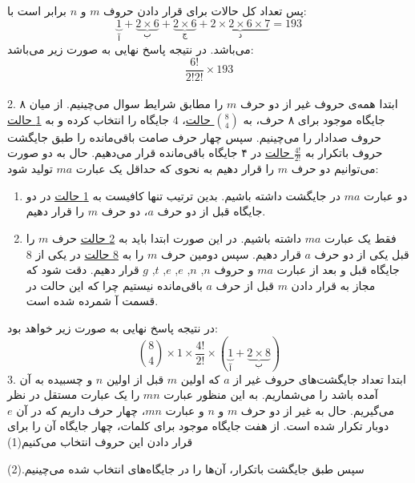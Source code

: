     \p
    پس تعداد کل حالات برای قرار دادن حروف 
    $m$ و $n$ 
     برابر است با:
    $$\underbrace{1}_{\text{آ}} + \underbrace{2\times 6}_{\text{ب}} + \underbrace{2\times 6}_{\text{ج}}+ \underbrace{2\times 2 \times 6 \times 7}_{\text{د}}‌=‌193$$
    می‌باشد.
    \p
    در نتیجه پاسخ نهایی به صورت زیر می‌باشد:
    $$\frac{6!}{2!2!} \times 193$$
    \\2.
    \p
    ابتدا همه‌ی حروف غیر از دو حرف $m$ را مطابق شرایط سوال می‌چینیم.
    از میان ۸ جایگاه موجود برای ۸ حرف، به 
    \underline{${8\choose 4}$ حالت}، 
    4
   جایگاه را انتخاب کرده و به
   \underline{1 حالت}
   حروف صدادار را می‌چینیم.
    سپس چهار حرف صامت باقی‌مانده
    را طبق جایگشت حروف باتکرار به
     \underline{$\frac{4!}{2!}$ حالت}
    در ۴ جایگاه باقی‌مانده قرار می‌دهیم.
    \p
    حال به دو صورت می‌توانیم دو حرف $m$ را قرار دهیم به نحوی که حداقل یک عبارت 
    $ma$ تولید شود:
    \begin{enumerate}
      \item 

      دو عبارت  $ma$  در جایگشت داشته باشیم.
       بدین ترتیب تنها کافیست به 
      \underline{1 حالت}
       در دو جایگاه قبل از دو حرف 
       $a$،  
       دو حرف 
       $m$ را قرار دهیم.

      \item
      فقط یک عبارت $ma$ داشته‌ باشیم. 
      در این صورت ابتدا باید به
      \underline{2 حالت}
      حرف 
      $m$ 
      را قبل یکی از دو حرف 
      $a$ 
      قرار دهیم. 
      سپس
       دومین حرف
      $m$
      را
      به
      \underline{8 حالت}
      در یکی از 8 جایگاه قبل و بعد از عبارت 
      $ma$
       و حروف 
       $n$, 
       $n$, 
       $e$, 
       $e$, 
       $t$, 
       $g$ 
       قرار دهیم.
       دقت شود که مجاز به قرار دادن 
      $m$
      قبل از حرف 
      $a$ 
      باقی‌مانده 
      نیستیم چرا که این حالت در قسمت آ شمرده شده است.
    \end{enumerate}
    \p
    در نتیجه پاسخ نهایی به صورت زیر خواهد بود:
    $${8\choose 4} \times 1 \times \frac{4!}{2!} \times (\underbrace{1}_{\text{آ}} + \underbrace{2 \times 8}_{\text{ب}})$$
    3.
    \p
    ابتدا تعداد جایگشت‌های  حروف غیر از $a$ که اولین $m$ قبل از اولین $n$ و چسبیده به آن آمده ‌باشد را می‌شماریم.
    به این منظور عبارت $mn$ را یک عبارت مستقل در نظر می‌گیریم.
    حال به غیر از دو حرف $m$ و $n$ و عبارت
     $mn$، 
    چهار حرف داریم که در آن $e$ دوبار تکرار شده است.
    از هفت جایگاه موجود برای کلمات، چهار جایگاه آن را برای قرار دادن این حروف انتخاب می‌کنیم(1)
    
    \p
    سپس طبق جایگشت باتکرار، آن‌ها را در جایگاه‌های انتخاب شده می‌چینیم.(2)
    

